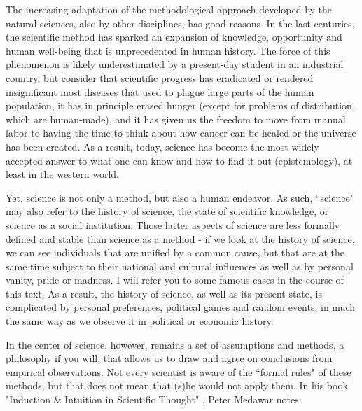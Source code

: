 \documentclass{tufte-book}
\begin{document}
The increasing adaptation of the methodological approach developed by the natural sciences, also by other disciplines, has good reasons. In the last centuries, the scientific method has sparked an expansion of knowledge, opportunity and human well-being that is unprecedented in human history. The force of this phenomenon is likely underestimated by a present-day student in an industrial country, but consider that scientific progress has eradicated or rendered insignificant most diseases that used to plague large parts of the human population, it has in principle erased hunger (except for problems of distribution, which are human-made), and it has given us the freedom to move from manual labor to having the time to think about how cancer can be healed or the universe has been created. As a result, today, science has become the most widely accepted answer to what one can know and how to find it out (epistemology), at least in the western world.

Yet, science is not only a method, but also a human endeavor. As such, ``science" may also refer to the history of science, the state of scientific knowledge, or science as a social institution. Those latter aspects of science are less formally defined and stable than science as a method - if we look at the history of science, we can see individuals that are unified by a common cause, but that are at the same time subject to their national and cultural influences as well as by personal vanity, pride or madness. I will refer you to some famous cases in the course of this text. As a result, the history of science, as well as its present state, is complicated by personal preferences, political games and random events, in much the same way as we observe it in political or economic history.

In the center of science, however, remains a set of assumptions and methods, a philosophy if you will, that allows us to draw and agree on conclusions from empirical observations. Not every scientist is aware of the ``formal rules" of these methods, but that does not mean that (s)he would not apply them. In his book "Induction \& Intuition in Scientific Thought" \citep{Medawar-Inductionintuitionscientific-2013}, Peter Medawar notes:
\end{document}
